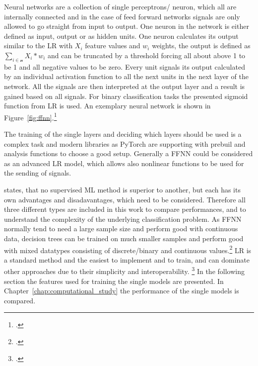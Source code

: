 Neural networks are a collection of single perceptrons/ neuron, which all are internally connected and
in the case of feed forward networks signals are only allowed to go straight from input to output. One neuron
in the network is either defined as input, output or as hidden units. One neuron calculates its
output similar to the \gls{LR} with $X_i$ feature values and $w_i$ weights, the output is defined
as $\sum_{i \in \mathcal{n}} X_i * w_i$ and can be truncated by a threshold forcing all about above 1
to be 1 and all negative values to be zero. Every unit signals its output calculated by an individual
activation function to all the next units in the next layer of the network. All the signals are
then interpreted at the output layer and a result is gained based on all signals. For binary classification tasks the presented sigmoid function from \gls{LR} is used. An exemplary neural network is shown in Figure~\ref{fig:ffnn}.\footcite[cf.][p.255]{kotsiantis_supervised_2007}



The training of the single layers and deciding which layers should be used is a complex task
and modern libraries as PyTorch are supporting with prebuil and analysis functions to choose a good setup. Generally a \gls{FFNN} could be considered as an advanced \gls{LR} model, which allows also nonlinear functions to be used for the sending of signals.

\parbreak
\cite{kotsiantis_supervised_2007} states, that no supervised \gls{ML} method is superior to another, but each has its own advantages and disadavantages, which need to be considered. Therefore all three different types are included in this work to compare performances, and to understand the complexity of the underlying classification problem. As \gls{FFNN} normally tend to need a large sample size and perform
good with continuous data, decision trees can be trained on much smaller samples and perform good with mixed datatypes consisting of discrete/binary and continuous values.\footcite[cf.][pp. 262ff.]{kotsiantis_supervised_2007} \gls{LR} is a standard method and the easiest to implement and to train, and can dominate other approaches due to their simplicity and interoperability. \footcite[cf.][p.8]{kirasich_random_2018}
In the following section the features used for training the single models are presented. In Chapter~\ref{chap:computational_study} the performance of the single models is compared.

\begin{comment}
\section{Model Training}
\label{sec:ModelTraining}

Training is based on which model selected, XGBoost or /gls{FFNN} from pytorch library or others. Afterwards the Mini batch descent
algorithm to train the model!
\end{comment}

